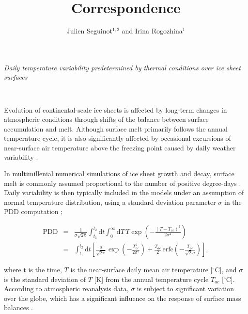 \documentclass[review]{igs}
\begin{document}
\title[Correspondence]{Correspondence}
\author[Seguinot and Rogozhina]{Julien Seguinot$^{1,2}$ and Irina Rogozhina$^1$}

\maketitle


\emph{Daily temperature variability predetermined by thermal conditions over ice sheet surfaces}

~

Evolution of continental-scale ice sheets is affected by long-term changes in atmospheric conditions through shifts of the balance between surface accumulation and melt. Although surface melt primarily follows the annual temperature cycle, it is also significantly affected by occasional excursions of near-surface air temperature above the freezing point caused by daily weather variability \citep{arnold-mackay-1964}.

In multimillenial numerical simulations of ice sheet growth and decay, surface melt is commonly assumed proportional to the number of positive degree-days \citep[PDD;][]{hock-2003}. Daily variability is then typically included in the models under an assumption of normal temperature distribution, using a standard deviation parameter $\sigma$ in the PDD computation \citep{braithwaite-1984,reeh-1991,calov-greve-2005};

\begin{eqnarray} \label{eq:pdd}
    \mathrm{PDD} &=& \frac{1}{\sigma\sqrt{2\pi}}
        \int_{t_1}^{t_2} \mathrm{d}t
        \int_{0}^{\infty} \mathrm{d}T \,
        T \exp\left({-\frac{(T-T_{ac})^2}{2\sigma^2}}\right)\\
    &=& \int_{t_1}^{t_2} \mathrm{d}t
        \left[\frac{\sigma}{\sqrt{2\pi}} \exp\left({-\frac{T_{ac}^2}{2\sigma^2}}\right)
        + \frac{T_{ac}}{2} \, \mathrm{erfc} \left(-\frac{T_{ac}}{\sqrt{2}\sigma}\right)\right],
\end{eqnarray}

where t is the time, $T$ is the near-surface daily mean air temperature [$^\circ$C], and $\sigma$ is the standard deviation of $T$ [K] from the annual temperature cycle $T_{ac}$ [$^\circ$C]. According to atmospheric reanalysis data, $\sigma$ is subject to significant variation over the globe, which has a significant influence on the response of surface mass balances \citep{seguinot-2013}.
\end{document}
